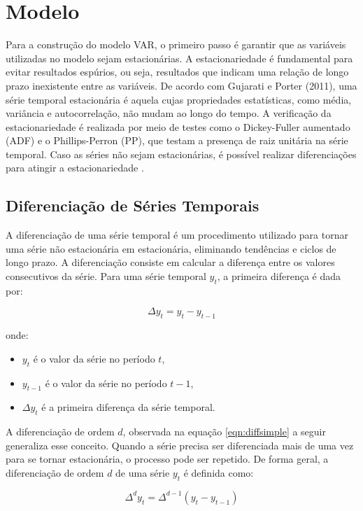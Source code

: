 \documentclass[12pt,oneside,a4paper,chapter=TITLE,english,brazil,sumario=abnt-6027-2012]{abntex2}
\begin{document}
\section{Modelo}

Para a construção do modelo VAR, o primeiro passo é garantir que as variáveis utilizadas no modelo sejam estacionárias. A estacionariedade é fundamental para evitar resultados espúrios, ou seja, resultados que indicam uma relação de longo prazo inexistente entre as variáveis. De acordo com Gujarati e Porter (2011), uma série temporal estacionária é aquela cujas propriedades estatísticas, como média, variância e autocorrelação, não mudam ao longo do tempo. A verificação da estacionariedade é realizada por meio de testes como o Dickey-Fuller aumentado (ADF) e o Phillips-Perron (PP), que testam a presença de raiz unitária na série temporal. Caso as séries não sejam estacionárias, é possível realizar diferenciações para atingir a estacionariedade \cite{gujarati_porter_2011}.

\subsection{Diferenciação de Séries Temporais}

A diferenciação de uma série temporal é um procedimento utilizado para tornar uma série não estacionária em estacionária, eliminando tendências e ciclos de longo prazo. A diferenciação consiste em calcular a diferença entre os valores consecutivos da série. Para uma série temporal \( y_t \), a primeira diferença é dada por:

\[
	\Delta y_t = y_t - y_{t-1}
\]

onde:

\begin{itemize}
	\item \( y_t \) é o valor da série no período \( t \),
	\item \( y_{t-1} \) é o valor da série no período \( t-1 \),
	\item \( \Delta y_t \) é a primeira diferença da série temporal.
\end{itemize}

A diferenciação de ordem \( d \), observada na equação \ref{eqn:diffsimple} a seguir generaliza esse conceito. Quando a série precisa ser diferenciada mais de uma vez para se tornar estacionária, o processo pode ser repetido. De forma geral, a diferenciação de ordem \( d \) de uma série \( y_t \) é definida como:

\begin{equation}
	\label{eqn:diffsimple}
	\Delta^d y_t = \Delta^{d-1}(y_t - y_{t-1})
\end{equation}
\end{document}
